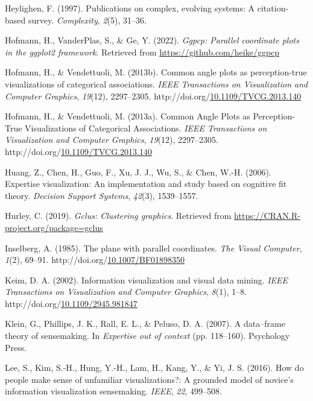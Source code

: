 \documentclass[print]{nuthesis}
\newlength{\cslhangindent}
\newenvironment{CSLReferences}[2]%
{\setlength{\parindent}{0pt}%
\everypar{\setlength{\hangindent}{\cslhangindent}}\ignorespaces}%
{\par}
\begin{document}
\begin{CSLReferences}{1}{0}
\leavevmode\hypertarget{ref-heylighen1997}{}%
Heylighen, F. (1997). Publications on complex, evolving systems: A citation-based survey. \emph{Complexity}, \emph{2}(5), 31--36.

\leavevmode\hypertarget{ref-ggpcp}{}%
Hofmann, H., VanderPlas, S., \& Ge, Y. (2022). \emph{Ggpcp: Parallel coordinate plots in the ggplot2 framework}. Retrieved from \url{https://github.com/heike/ggpcp}

\leavevmode\hypertarget{ref-Heike2013}{}%
Hofmann, H., \& Vendettuoli, M. (2013b). Common angle plots as perception-true visualizations of categorical associations. \emph{IEEE Transactions on Visualization and Computer Graphics}, \emph{19}(12), 2297--2305. http://doi.org/\href{https://doi.org/10.1109/TVCG.2013.140}{10.1109/TVCG.2013.140}

\leavevmode\hypertarget{ref-Hofmann:2013}{}%
Hofmann, H., \& Vendettuoli, M. (2013a). {Common Angle Plots as Perception-True Visualizations of Categorical Associations}. \emph{IEEE Transactions on Visualization and Computer Graphics}, \emph{19}(12), 2297--2305. http://doi.org/\href{https://doi.org/10.1109/TVCG.2013.140}{10.1109/TVCG.2013.140}

\leavevmode\hypertarget{ref-huang2006}{}%
Huang, Z., Chen, H., Guo, F., Xu, J. J., Wu, S., \& Chen, W.-H. (2006). Expertise visualization: An implementation and study based on cognitive fit theory. \emph{Decision Support Systems}, \emph{42}(3), 1539--1557.

\leavevmode\hypertarget{ref-Hurley}{}%
Hurley, C. (2019). \emph{Gclus: Clustering graphics}. Retrieved from \url{https://CRAN.R-project.org/package=gclus}

\leavevmode\hypertarget{ref-Inselberg}{}%
Inselberg, A. (1985). {The plane with parallel coordinates}. \emph{The Visual Computer}, \emph{1}(2), 69--91. http://doi.org/\href{https://doi.org/10.1007/BF01898350}{10.1007/BF01898350}

\leavevmode\hypertarget{ref-kiem2002}{}%
Keim, D. A. (2002). Information visualization and visual data mining. \emph{IEEE Transactions on Visualization and Computer Graphics}, \emph{8}(1), 1--8. http://doi.org/\href{https://doi.org/10.1109/2945.981847}{10.1109/2945.981847}

\leavevmode\hypertarget{ref-klein2007}{}%
Klein, G., Phillips, J. K., Rall, E. L., \& Peluso, D. A. (2007). A data--frame theory of sensemaking. In \emph{Expertise out of context} (pp. 118--160). Psychology Press.

\leavevmode\hypertarget{ref-lee}{}%
Lee, S., Kim, S.-H., Hung, Y.-H., Lam, H., Kang, Y., \& Yi, J. S. (2016). How do people make sense of unfamiliar visualizations?: A grounded model of novice's information visualization sensemaking. \emph{IEEE}, \emph{22}, 499--508.


\end{CSLReferences}
\end{document}
